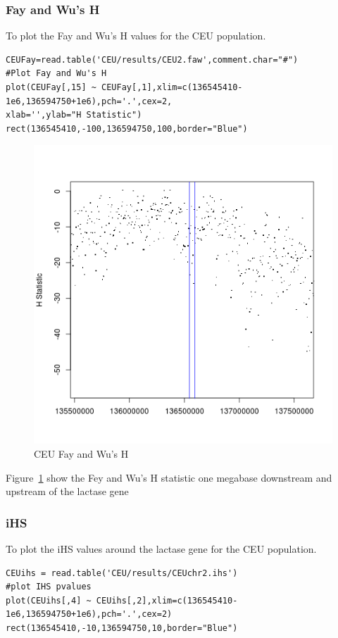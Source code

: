 \documentclass[a4paper,10pt]{article}
\begin{document}
\subsubsection{Fay and Wu's H}
To plot the Fay and Wu's H values for the CEU population.\\
\begin{verbatim}
CEUFay=read.table('CEU/results/CEU2.faw',comment.char="#")
#Plot Fay and Wu's H
plot(CEUFay[,15] ~ CEUFay[,1],xlim=c(136545410-1e6,136594750+1e6),pch='.',cex=2,
xlab='',ylab="H Statistic")
rect(136545410,-100,136594750,100,border="Blue") 
\end{verbatim}
\begin{figure}
\centering
\includegraphics{pictures/CEUFay.png}
\caption{CEU Fay and Wu's H}
\label{fig:fay}
\end{figure}
Figure~\ref{fig:fay} show the Fey and Wu's H statistic one megabase downstream and upstream of the lactase gene

\subsubsection{iHS}
To plot the iHS values around the lactase gene for the CEU population.\\
\begin{verbatim}
CEUihs = read.table('CEU/results/CEUchr2.ihs')
#plot IHS pvalues
plot(CEUihs[,4] ~ CEUihs[,2],xlim=c(136545410-1e6,136594750+1e6),pch='.',cex=2)
rect(136545410,-10,136594750,10,border="Blue") 
\end{verbatim}
\end{document}
